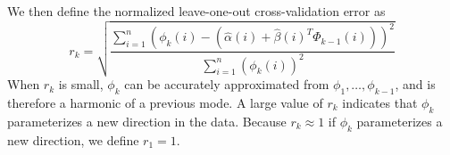 \documentclass[preprint]{elsarticle}
\begin{document}
We then define the normalized leave-one-out cross-validation error as
\begin{equation} \label{eq:cv_error}
r_{k} = \sqrt{ \frac{\sum_{i=1}^n \left( \phi_{k} (i) - (\hat{\alpha}(i) + \hat{\beta}(i)^T \Phi_{k-1}(i))  \right)^2} {\sum_{i=1}^n  \left( \phi_{k} (i) \right)^2 }}
\end{equation}
%
%
%
%
%
When $r_{k}$ is small, $\phi_{k}$ can be accurately approximated from $\phi_1, \dots, \phi_{k-1}$, and is therefore a harmonic of a previous mode.
%
A large value of $r_{k}$ indicates that $\phi_{k}$ parameterizes a new direction in the data.
%
Because $r_{k} \approx 1$ if $\phi_{k}$ parameterizes a new direction, we define $r_1 = 1$.
\end{document}
